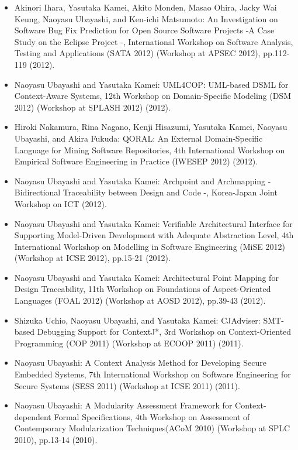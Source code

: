 \documentclass{article}
\begin{document}
\begin{itemize}
\item Akinori Ihara, Yasutaka Kamei, Akito Monden, Masao Ohira, Jacky Wai Keung, Naoyasu Ubayashi, and Ken-ichi Matsumoto:
An Investigation on Software Bug Fix Prediction for Open Source Software Projects -A Case Study on the Eclipse Project -,
International Workshop on Software Analysis, Testing and Applications (SATA 2012) (Workshop at APSEC 2012), pp.112-119 (2012).

\item Naoyasu Ubayashi and Yasutaka Kamei:
UML4COP: UML-based DSML for Context-Aware Systems,
12th Workshop on Domain-Specific Modeling (DSM 2012) (Workshop at SPLASH 2012) (2012).

\item Hiroki Nakamura, Rina Nagano, Kenji Hisazumi, Yasutaka Kamei, Naoyasu Ubayashi, and Akira Fukuda:
QORAL: An External Domain-Specific Language for Mining Software Repositories,
4th International Workshop on Empirical Software Engineering in Practice (IWESEP 2012) (2012).

\item Naoyasu Ubayashi and Yasutaka Kamei:
Archpoint and Archmapping - Bidirectional Traceability between Design and Code -,
Korea-Japan Joint Workshop on ICT (2012).

\item Naoyasu Ubayashi and Yasutaka Kamei:
Verifiable Architectural Interface for Supporting Model-Driven Development with Adequate Abstraction Level,
4th International Workshop on Modelling in Software Engineering (MiSE 2012) (Workshop at ICSE 2012), pp.15-21 (2012).

\item Naoyasu Ubayashi and Yasutaka Kamei:
Architectural Point Mapping for Design Traceability,
11th Workshop on Foundations of Aspect-Oriented Languages (FOAL 2012) (Workshop at AOSD 2012), pp.39-43 (2012).

\item Shizuka Uchio, Naoyasu Ubayashi, and Yasutaka Kamei:
CJAdviser: SMT-based Debugging Support for ContextJ*,
3rd Workshop on Context-Oriented Programming (COP 2011) (Workshop at ECOOP 2011) (2011).

\item Naoyasu Ubayashi:
A Context Analysis Method for Developing Secure Embedded Systems,
7th International Workshop on Software Engineering for Secure Systems (SESS 2011) (Workshop at ICSE 2011) (2011).

\item Naoyasu Ubayashi:
A Modularity Assessment Framework for Context-dependent Formal Specifications,
4th Workshop on Assessment of Contemporary Modularization Techniques(ACoM 2010) (Workshop at SPLC 2010),
pp.13-14 (2010).


\end{itemize}
\end{document}
